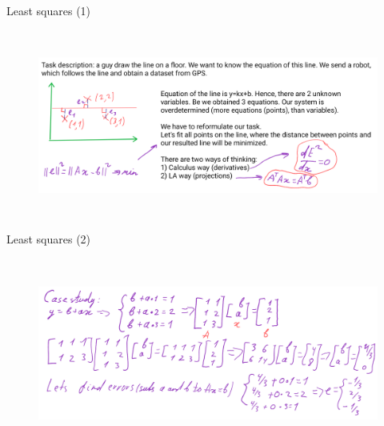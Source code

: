 \documentclass[aspectratio=169]{beamer}
\begin{document}
        \begin{frame}[t]{Least squares (1)}
            \framesubtitle{}
                \begin{figure}[H]
                    \centering\includegraphics[height=6cm,width=1\textwidth,keepaspectratio]{Заметка2_4.png}
                    \label{fig:Заметка2_4.png}
                \end{figure}
            \end{frame}

            \begin{frame}[t]{Least squares (2)}
                \framesubtitle{}
                    \begin{figure}[H]
                        \centering\includegraphics[height=6cm,width=1\textwidth,keepaspectratio]{Заметка2_5.png}
                        \label{fig:Заметка2_5.png}
                    \end{figure}
                \end{frame}
\end{document}
